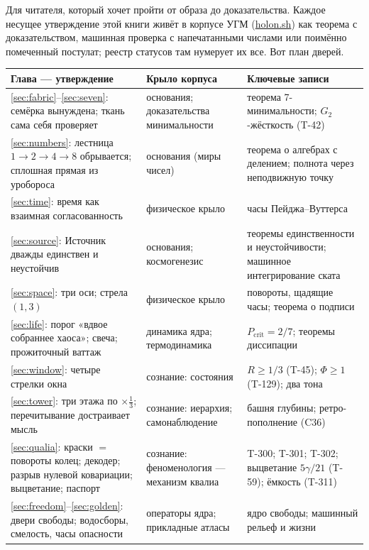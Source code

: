 \documentclass[11pt,letterpaper]{article}
\newcommand{\holonsh}{\href{https://holon.sh}{holon.sh}\xspace}
\begin{document}
Для читателя, который хочет пройти от образа до доказательства.
Каждое несущее утверждение этой книги живёт в корпусе УГМ
(\holonsh) как теорема с доказательством, машинная проверка с
напечатанными числами или поимённо помеченный постулат; реестр
статусов там нумерует их все. Вот план дверей.

\begin{center}\small
\begin{tabular}{@{}p{}p{}p{}@{}}
\toprule
\textbf{Глава --- утверждение} & \textbf{Крыло корпуса} & \textbf{Ключевые записи} \\
\midrule
\ref{sec:fabric}--\ref{sec:seven}: семёрка вынуждена; ткань сама
себя проверяет & основания; доказательства минимальности & теорема
7-минимальности; $G_2$-жёсткость (T-42) \\[2pt]
\ref{sec:numbers}: лестница $1{\to}2{\to}4{\to}8$ обрывается;
сплошная прямая из уробороса & основания (миры чисел) & теорема о
алгебрах с делением; полнота через неподвижную точку \\[2pt]
\ref{sec:time}: время как взаимная согласованность & физическое
крыло & часы Пейджа--Вуттерса \\[2pt]
\ref{sec:source}: Источник дважды единствен и неустойчив &
основания; космогенезис & теоремы единственности и неустойчивости;
машинное интегрирование ската \\[2pt]
\ref{sec:space}: три оси; стрела $(1{,}3)$ & физическое крыло &
повороты, щадящие часы; теорема о подписи \\[2pt]
\ref{sec:life}: порог «вдвое собраннее хаоса»; свеча; прожиточный
ваттаж & динамика ядра; термодинамика & $P_{\text{crit}}=2/7$;
теоремы диссипации \\[2pt]
\ref{sec:window}: четыре стрелки окна & сознание: состояния &
$R\geq 1/3$ (T-45); $\Phi\geq 1$ (T-129); два тона \\[2pt]
\ref{sec:tower}: три этажа по $\times\tfrac13$; перечитывание
достраивает мысль & сознание: иерархия; самонаблюдение & башня
глубины; ретро-пополнение (C36) \\[2pt]
\ref{sec:qualia}: краски $=$ повороты колец; декодер; разрыв
нулевой ковариации; выцветание; паспорт & сознание: феноменология
--- механизм квалиа & T-300; T-301; T-302; выцветание $5\gamma/21$
(T-59); ёмкость (T-311) \\[2pt]
\ref{sec:freedom}--\ref{sec:golden}: двери свободы; водосборы,
смелость, часы опасности & операторы ядра; прикладные атласы &
ядро свободы; машинный рельеф и жизни \\[2pt]

\end{tabular}
\end{center}
\end{document}
